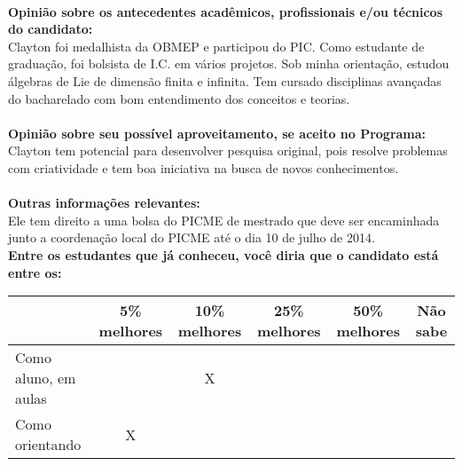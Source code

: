 \documentclass[11pt]{article}
\begin{document}
\\
\textbf{Opinião sobre os antecedentes acadêmicos, profissionais e/ou técnicos do candidato:}
\\Clayton foi medalhista da OBMEP e participou do PIC. Como estudante de graduação, foi bolsista de I.C. em vários projetos. Sob minha orientação, 
estudou álgebras de Lie de dimensão finita e infinita. Tem cursado disciplinas avançadas do bacharelado com bom entendimento dos conceitos e teorias.\\
\\
\textbf{Opinião sobre seu possível aproveitamento, se aceito no Programa:}
\\Clayton tem potencial para desenvolver pesquisa original, pois resolve problemas com criatividade e tem boa iniciativa na busca de novos conhecimentos.\\ 
\\
\textbf{Outras informações relevantes:} \\Ele tem direito a uma bolsa do PICME de mestrado que deve ser 
encaminhada junto a coordenação local do PICME até o dia 10 de julho de 2014.
\\[0.3cm]
\textbf{Entre os estudantes que já conheceu, você diria que o candidato está entre os:}
\\
\begin{tabular}{|l|c|c|c|c|c|}
\hline
 & 5\% melhores & 10\% melhores & 25\% melhores & 50\% melhores & Não sabe \\
\hline
Como aluno, em aulas &  & X &  &  & \\
\hline
Como orientando & X &  &  &  & \\
\hline
\end{tabular}
\end{document}
